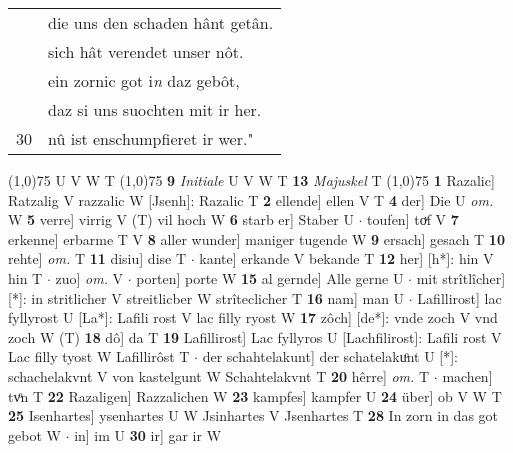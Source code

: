 \documentclass[8pt,a4paper,notitlepage]{article}
\begin{document}
\begin{table}[ht]
\begin{minipage}[t]{0.5\linewidth}
\begin{tabular}{rl}
 & die uns den schaden hânt getân.\\ 
 & sich hât verendet unser nôt.\\ 
 & ein zornic got i\textit{n} daz gebôt,\\ 
 & daz si uns suochten mit ir her.\\ 
30 & nû ist enschumpfieret ir wer."\\ 
\end{tabular}
\scriptsize
\line(1,0){75} \newline
U V W T \newline
\line(1,0){75} \newline
\textbf{9} \textit{Initiale} U V W T  \textbf{13} \textit{Majuskel} T  \newline
\line(1,0){75} \newline
\textbf{1} Razalic] Ratzalig V razzalic W [Jsenh]: Razalic T \textbf{2} ellende] ellen V T \textbf{4} der] Die U \textit{om.} W \textbf{5} verre] virrig V (T) vil hoch W \textbf{6} starb er] Staber U  $\cdot$ toufen] toͮf V \textbf{7} erkenne] erbarme T V \textbf{8} aller wunder] maniger tugende W \textbf{9} ersach] gesach T \textbf{10} rehte] \textit{om.} T \textbf{11} disiu] dise T  $\cdot$ kante] erkande V bekande T \textbf{12} her] [h*]: hin V hin T  $\cdot$ zuo] \textit{om.} V  $\cdot$ porten] porte W \textbf{15} al gernde] Alle gerne U  $\cdot$ mit strîtlîcher] [*]: in stritlicher V streitlicber W strîteclicher T \textbf{16} nam] man U  $\cdot$ Lafillirost] lac fyllyrost U [La*]: Lafili rost V lac filly ryost W \textbf{17} zôch] [de*]: vnde zoch V vnd zoch W (T) \textbf{18} dô] da T \textbf{19} Lafillirost] Lac fyllyros U [Lachfilirost]: Lafili rost V Lac filly tyost W Lafillirôst T  $\cdot$ der schahtelakunt] der schatelakuͦnt U [*]: schachelakvnt V von kastelgunt W Schahtelakvnt T \textbf{20} hêrre] \textit{om.} T  $\cdot$ machen] tvͦn T \textbf{22} Razaligen] Razzalichen W \textbf{23} kampfes] kampfer U \textbf{24} über] ob V W T \textbf{25} Isenhartes] ysenhartes U W Jsinhartes V Jsenhartes T \textbf{28} In zorn in das got gebot W  $\cdot$ in] im U \textbf{30} ir] gar ir W \newline
\end{minipage}
\end{table}
\end{document}
